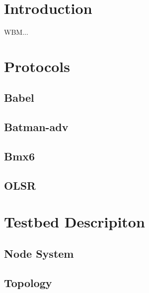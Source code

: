 \documentclass[a4paper,12pt,twoside]{article}
\begin{document}
\section{Introduction}
\label{sec:introduction}


WBM...

\section{Protocols}


\subsection{Babel}

\subsection{Batman-adv}

\subsection{Bmx6}

\subsection{OLSR}


\section{Testbed Descripiton}

\subsection{Node System}

\subsection{Topology}
\end{document}

